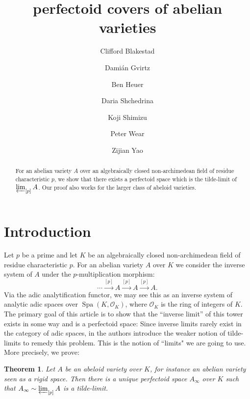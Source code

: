 \documentclass[10pt,oneside]{amsart}
\title[perfectoid covers of abelian varieties]{perfectoid  covers of abelian varieties}
\author{
	Clifford Blakestad \and
	Dami\'an Gvirtz \and
	Ben Heuer \and 
	Daria Shchedrina \and
	Koji Shimizu \and 
	Peter Wear \and
	Zijian Yao}
\newtheorem{mainthm}{Theorem}
\theoremstyle{definition}
\begin{document}
	
	\maketitle
	
	\begin{abstract}
For an abelian variety $A$ over an algebraically closed non-archimedean field of residue characteristic $p$, we show that there exists a perfectoid space which is the tilde-limit of $\varprojlim_{[p]}A$. Our proof also works for the larger class of abeloid varieties.
	\end{abstract}
	

	
	\section{Introduction} 

Let $p$ be a prime and let $K$ be an algebraically closed non-archimedean field of residue characteristic $p$.
For an abelian variety $A$ over $K$ we consider the inverse system of $A$ under the $p$-multiplication morphism:
\[\cdots\xrightarrow{[p]}A\xrightarrow{[p]}A\xrightarrow{[p]}A.\]
Via the adic analytification functor, we may see this as an inverse system of analytic adic spaces over $\operatorname{Spa}(K,\mathcal O_K)$, where $\mathcal O_K$ is the ring of integers of $K$.
The primary goal of this article is to show that the ``inverse limit'' of this tower exists in some way and is a perfectoid space: Since inverse limits rarely exist in the category of adic spaces, in \cite{SW} the authors introduce the weaker notion of tilde-limits to remedy this problem. This is the notion of ``limits" we are going to use. More precisely, we prove:

 


\begin{mainthm} \label{thm:main_thm_intro}
	Let $A$ be an abeloid variety over $K$, for instance an abelian variety seen as a rigid space. Then there is a unique perfectoid space $A_\infty$ over $K$ such that
	$A_\infty \sim \varprojlim_{[p]} A$ is a tilde-limit.
\end{mainthm}
\end{document}
